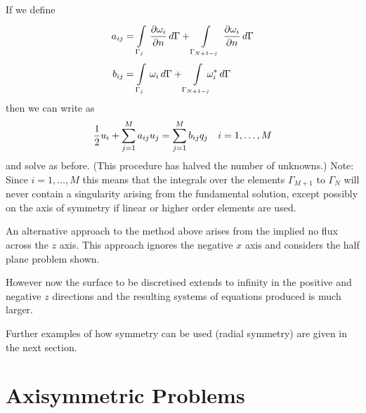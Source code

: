 If we define
\begin{align}
    a_{ij} &=   \displaystyle\int\limits_{\Gamma_{j}}^{} \, \dfrac{\partial \omega_{i}}{\partial n} \,d\Gamma  +
      \displaystyle\int\limits_{\Gamma_{N+1-j}}^{} \, \dfrac{\partial \omega_{i}}{\partial n} \,d\Gamma  \\ 
    b_{ij} &=   \displaystyle\int\limits_{\Gamma_{j}}^{} \,\omega_{i}\,d\Gamma  + 
      \displaystyle\int\limits_{\Gamma_{N+1-j}}^{} \,\negthickspace\negthickspace\negthickspace\omega_{i}^{*}\,d\Gamma 
\end{align}
then we can write  as
\begin{equation}
  \dfrac{1}{2} u_{i} +  \displaystyle\sum_{j=1}^{M}  a_{ij}u_{j} =  \displaystyle\sum_{j=1}^{M}  b_{ij}q_{j} \quad
  i=1,\ldots,M
  \label{eqn:nodes2}
\end{equation}
and solve as before. (This procedure has halved the number of unknowns.)
\newline Note: Since $i=1,\ldots,M$ this means that the integrals over the
elements $\Gamma_{M+1}$ to $\Gamma_{N}$ will never contain a singularity
arising from the fundamental solution, except possibly on the axis of symmetry
if linear or higher order elements are used.

An alternative approach to the method above arises from the implied no flux
across the $z$ axis. This approach ignores the negative $x$ axis and considers
the half plane problem shown.

However now the surface to be discretised extends to infinity in the positive
and negative $z$ directions and the resulting systems of equations produced is
much larger.  

Further examples of how symmetry can be used (\eg radial symmetry) are given
in the next section.

\section{Axisymmetric Problems}

